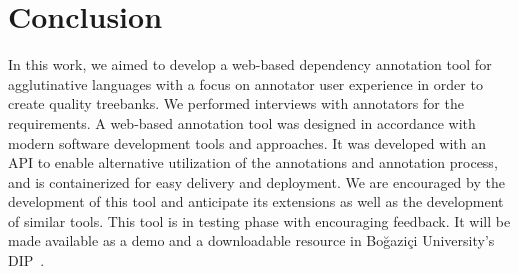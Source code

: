 \section{Conclusion}
\label{sec:conclusion}

In this work, we aimed to develop a web-based dependency annotation tool for agglutinative languages with a focus on annotator user experience in order to create quality treebanks.
We performed interviews with annotators for the requirements.
A web-based annotation tool was designed in accordance with modern software development tools and approaches.
It was developed with an API to enable alternative utilization of the annotations and annotation process, and is containerized for easy delivery and deployment.
We are encouraged by the development of this tool and anticipate its extensions as well as the development of similar tools.
This tool is in testing phase with encouraging feedback.
It will be made available as a demo and a downloadable resource in Boğaziçi University's DIP~\cite{DIP}.
